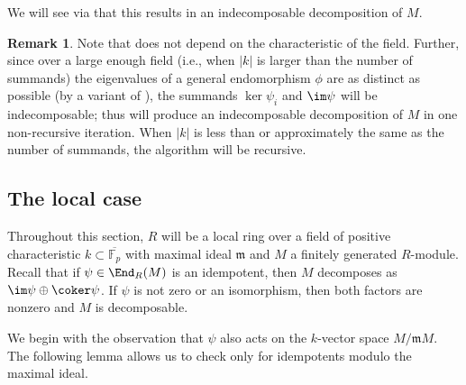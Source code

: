 \documentclass[12pt]{amsart}
\def\FF{\mathbb F}
\def\m{\mathfrak m}
\theoremstyle{theorem}
\numberwithin{thm}{section}
\theoremstyle{definition}
\newtheorem{rem}[thm]{Remark}
\begin{document}
We will see via  that this results in an indecomposable decomposition of $M$.


\begin{rem}\label{rem:graded}
  Note that  does not depend on the characteristic of the field. Further, since over a large enough field (i.e., when $|k|$ is larger than the number of summands) the eigenvalues of a general endomorphism $\phi$ are as distinct as  possible (by a variant of ), the summands $\ker\psi_i$ and $\im\psi$ will be indecomposable; thus  will produce an indecomposable decomposition of $M$ in one non-recursive iteration. When $|k|$ is less than or approximately the same as the number of summands, the algorithm will be recursive.
\end{rem}

\subsection{The local case}\label{sec:local-alg}

Throughout this section, $R$ will be a local ring over a field of positive characteristic $k \subset \overline{\FF_p}$ with maximal ideal $\m$ and $M$ a finitely generated $R$-module. Recall that if $\psi\in\End_R(M)$ is an idempotent, then $M$ decomposes as $\im \psi \oplus \coker \psi$. If $\psi$ is not zero or an isomorphism, then both factors are nonzero and $M$ is decomposable.

We begin with the observation that $\psi$ also acts on the $k$-vector space $M/\m M$. The following lemma allows us to check only for idempotents modulo the maximal ideal.
\end{document}
